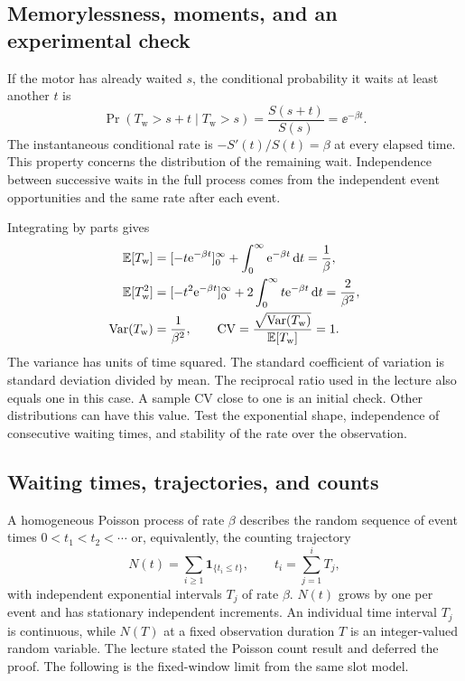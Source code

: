 \subsection{Memorylessness, moments, and an experimental check}
\label{subsec:l06-memoryless}

If the motor has already waited $s$, the conditional probability it waits at least another $t$ is
\begin{equation}
 \Pr(T_{\mathrm{w}}>s+t\mid T_{\mathrm{w}}>s)
 =\frac{S(s+t)}{S(s)}=\ee^{-\beta t}.
 \label{eq:l06-memoryless}
\end{equation}
The instantaneous conditional rate is $-S'(t)/S(t)=\beta$ at every elapsed time. This property concerns the distribution of the remaining wait. Independence between successive waits in the full process comes from the independent event opportunities and the same rate after each event.

Integrating by parts gives
\begin{align}
 \mathbb E[T_{\mathrm{w}}]
 &= [-t\mathrm{e}^{-\beta t}]_0^\infty+\int_0^\infty\mathrm{e}^{-\beta t}\,\mathrm{d} t
 =\frac1\beta,\notag\\
 \mathbb E[T_{\mathrm{w}}^2]
 &=[-t^2\mathrm{e}^{-\beta t}]_0^\infty
   +2\int_0^\infty t\mathrm{e}^{-\beta t}\,\mathrm{d} t=\frac{2}{\beta^2},\notag\\
 \operatorname{Var}(T_{\mathrm{w}})&=\frac{1}{\beta^2},\qquad
 \mathrm{CV}=\frac{\sqrt{\operatorname{Var}(T_{\mathrm{w}})}}{\mathbb E[T_{\mathrm{w}}]}=1.
 \label{eq:l06-wait-moments}
\end{align}
The variance has units of time squared. The standard coefficient of variation is standard deviation divided by mean. The reciprocal ratio used in the lecture also equals one in this case. A sample CV close to one is an initial check. Other distributions can have this value. Test the exponential shape, independence of consecutive waiting times, and stability of the rate over the observation.

\subsection{Waiting times, trajectories, and counts}
\label{subsec:l06-poisson-counts}

A homogeneous Poisson process of rate $\beta$ describes the random sequence of event times $0<t_1<t_2<\cdots$ or, equivalently, the counting trajectory
\begin{equation}
 N(t)=\sum_{i\ge1}\mathbf1_{\{t_i\le t\}},\qquad
 t_i=\sum_{j=1}^{i}T_j,
 \label{eq:l06-event-path}
\end{equation}
with independent exponential intervals $T_j$ of rate $\beta$. $N(t)$ grows by one per event and has stationary independent increments. An individual time interval $T_j$ is continuous, while $N(T)$ at a fixed observation duration $T$ is an integer-valued random variable. The lecture stated the Poisson count result and deferred the proof. The following is the fixed-window limit from the same slot model.


